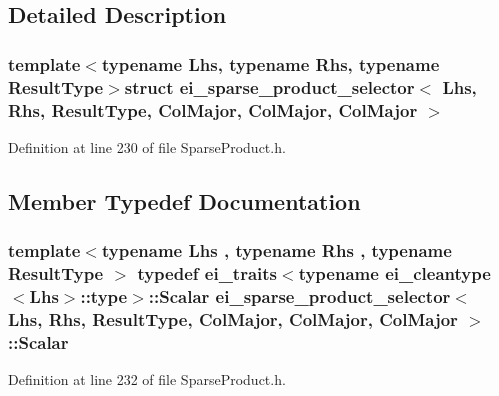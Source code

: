 \subsection{Detailed Description}
\subsubsection*{template$<$typename Lhs, typename Rhs, typename Result\-Type$>$struct ei\-\_\-sparse\-\_\-product\-\_\-selector$<$ Lhs, Rhs, Result\-Type, Col\-Major, Col\-Major, Col\-Major $>$}



Definition at line 230 of file Sparse\-Product.\-h.



\subsection{Member Typedef Documentation}
\hypertarget{structei__sparse__product__selector_3_01_lhs_00_01_rhs_00_01_result_type_00_01_col_major_00_01_col_major_00_01_col_major_01_4_a426dde0a2783cff130eac8e87b609f77}{
\subsubsection[{Scalar}]{\setlength{\rightskip}{0pt plus 5cm}template$<$typename Lhs , typename Rhs , typename Result\-Type $>$ typedef {\bf ei\-\_\-traits}$<$typename {\bf ei\-\_\-cleantype}$<$Lhs$>$\-::{\bf type}$>$\-::{\bf Scalar} {\bf ei\-\_\-sparse\-\_\-product\-\_\-selector}$<$ Lhs, Rhs, Result\-Type, {\bf Col\-Major}, {\bf Col\-Major}, {\bf Col\-Major} $>$\-::{\bf Scalar}}}\label{structei__sparse__product__selector_3_01_lhs_00_01_rhs_00_01_result_type_00_01_col_major_00_01_col_major_00_01_col_major_01_4_a426dde0a2783cff130eac8e87b609f77}


Definition at line 232 of file Sparse\-Product.\-h.



